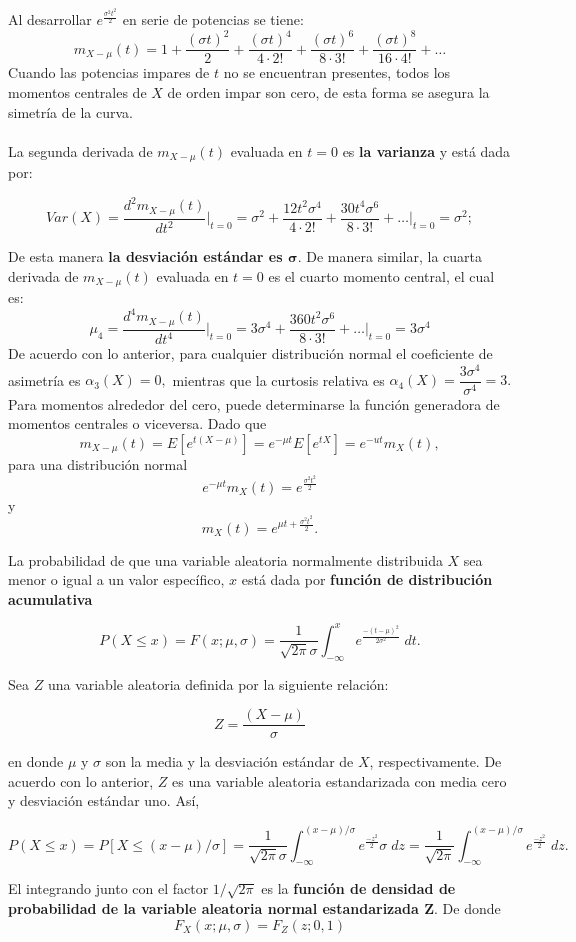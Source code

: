 Al desarrollar $e^{\frac{\sigma^2 t^2}{2}}$ en serie de potencias se tiene:
$$m_{X-\mu}(t) = 1+\dfrac{(\sigma t)^2}{2}+\dfrac{(\sigma t)^4}{4\cdot 2!}+\dfrac{(\sigma t)^6}{8\cdot 3!}+\dfrac{(\sigma t)^8}{16\cdot 4!} + \ldots$$
Cuando las potencias impares de $t$ no se encuentran presentes, todos los momentos centrales de $X$ de orden impar son cero, de esta forma se asegura la simetría de la curva.\\\\

La segunda derivada de $m_{X-\mu}(t)$  evaluada en $t=0$ es \textbf{la varianza} y está dada por:
\begin{tcolorbox}
    $$Var(X)=\dfrac{d^2m_{X-\mu}(t)}{dt^2}\bigg|_{t=0}=\sigma^2 + \dfrac{12t^2 \sigma^4}{4\cdot 2!}+\dfrac{30t^4\sigma^6}{8\cdot 3!} + \ldots \bigg|_{t=0} = \sigma^2;$$
\end{tcolorbox}

De esta manera \textbf{ la desviación estándar es  $\mathbold \sigma$}. De manera similar, la cuarta derivada de $m_{X-\mu}(t)$ evaluada en $t=0$ es el cuarto momento central, el cual es:
$$\mu_4=\dfrac{d^4m_{X-\mu}(t)}{dt^4}\bigg|_{t=0}=3\sigma^4 + \dfrac{360t^2\sigma^6}{8\cdot 3!}+ \ldots \bigg|_{t=0}=3\sigma^4$$
De acuerdo con lo anterior, para cualquier distribución normal el coeficiente de asimetría es $\alpha_3(X)=0,$ mientras que la curtosis relativa es $\alpha_4(X)=\dfrac{3\sigma^4}{\sigma^4} = 3.$ Para momentos alrededor del cero, puede determinarse la función generadora de momentos centrales o viceversa. Dado que
$$m_{X-\mu}(t)=E\left[e^{t(X-\mu)}\right]=e^{-\mu t}E\left[e^{tX}\right] = e^{-ut}m_X(t),$$
para una distribución normal
$$e^{-\mu t}m_X (t) = e^{\frac{\sigma^2t^2}{2}}$$
y
$$m_X (t)=e^{\mu t + \frac{\sigma^2t^2}{2}}.$$

La probabilidad de que una variable aleatoria normalmente distribuida $X$ sea menor o igual a un valor específico, $x$ está dada por \textbf{función de distribución acumulativa}
\begin{tcolorbox}
    $$P(X\leq x)=F(x;\mu,\sigma) = \dfrac{1}{\sqrt{2\pi}\sigma}\int_{-\infty}^{x} e^{\frac{-(t-\mu)^2}{2\sigma^2}}\; dt.$$
\end{tcolorbox}

Sea $Z$ una variable aleatoria definida por la siguiente relación:

$$Z=\dfrac{(X-\mu)}{\sigma}$$

en donde $\mu$ y $\sigma$ son la media y la desviación estándar de $X$, respectivamente. De acuerdo con lo anterior, $Z$ es una variable aleatoria estandarizada con media cero y desviación estándar uno. Así,
\begin{tcolorbox}
    $$P(X\leq x) = P[X\leq (x-\mu)/\sigma] = \dfrac{1}{\sqrt{2\pi}\sigma}\int_{-\infty}^{(x-\mu)/\sigma} e^{\frac{-z^2}{2}}\sigma \; dz = \dfrac{1}{\sqrt{2\pi}} \int_{-\infty}^{(x-\mu)/\sigma} e^{\frac{-z^2}{2}}\; dz.$$
\end{tcolorbox}
El integrando junto con el factor $1/\sqrt{2\pi}$ es la \textbf{función de densidad de probabilidad de la variable aleatoria normal estandarizada Z}. De donde 
$$F_X(x;\mu,\sigma) = F_Z(z;0,1)$$

